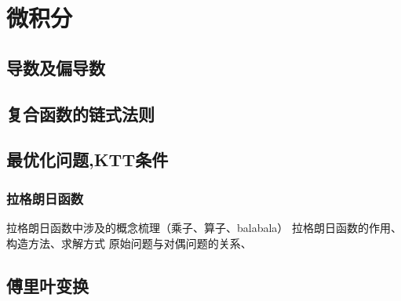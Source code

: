 \chapter{微积分}
    \section{导数及偏导数}
    \section{复合函数的链式法则}
    \section{最优化问题,KTT条件}
    \subsection{拉格朗日函数}
    拉格朗日函数中涉及的概念梳理（乘子、算子、balabala）
    拉格朗日函数的作用、构造方法、求解方式
    原始问题与对偶问题的关系、

    \section{傅里叶变换}